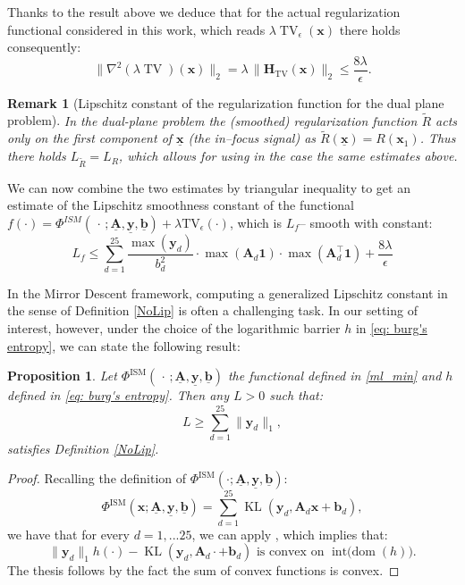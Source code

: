 \documentclass[letterpaper]{article}
\newcommand{\x}{\mathbf{x}}
\newcommand{\A}{\mathbf{A}}
\newcommand{\y}{\mathbf{y}}
\newtheorem{proposition}{Proposition}
\newtheorem{remark}{Remark}
\begin{document}
Thanks to the result above we deduce that for the actual regularization functional considered in this work, which reads $\lambda\operatorname{TV}_\epsilon(\mathbf{x})$ there holds consequently:
\begin{equation}
\|\nabla^2(\lambda\operatorname{TV})(\mathbf{x})\|_2 
    = \lambda\,\|\mathbf{H}_{\text{TV}}(\mathbf{x})\|_2 \leq \frac{8\lambda}{\epsilon}.
\end{equation}

\begin{remark}[Lipschitz constant of the regularization function for the dual plane problem]
    In the dual-plane problem the (smoothed) regularization function $\tilde{R}$ acts only on the first component of $\underline{\x}$ (the in--focus signal) as $\tilde{R}(\underline{\x}) = R(\x_1)$. Thus there holds $L_{\tilde{R}} = L_{R}$, which allows for using in the case the same estimates above.
\end{remark}
We can now combine the two estimates by triangular inequality to get an estimate of the Lipschitz smoothness constant of the functional $f(\cdot) = \Phi^{ISM}(\,\cdot\,; \underline{\mathbf{A}}, \underline{\mathbf{y}}, 
\underline{\mathbf{b}}) + \lambda \text{TV}_{\epsilon}(\cdot)$, which is $L_{f}$-- smooth with constant:
\begin{equation}
    L_{f} \leq \sum_{d=1}^{25} 
    \frac{\max(\mathbf{y}_d)}{b_d^2} \cdot \max(\mathbf{A}_d \mathbf{1}) \cdot 
    \max(\mathbf{A}_d^\top \mathbf{1}) + \frac{8 \lambda}{\epsilon}
    \end{equation}


In the Mirror Descent framework, computing a generalized Lipschitz constant in the sense of Definition \ref{NoLip} is often a challenging task. In our setting of interest, however, under the choice of the logarithmic barrier $h$ in \eqref{eq: burg's entropy}, we can state the following result:
\begin{proposition}
    Let $\Phi^{\text{ISM}}(\,\cdot\,; \underline{\mathbf{A}}, \underline{\mathbf{y}}, 
\underline{\mathbf{b}})$  the functional defined in \eqref{ml_min} and $h$ defined in \eqref{eq: burg's entropy}. Then any $L> 0$ such that:
\begin{equation}
    L \geq \sum^{25}_{d=1} \|\y_d\|_1,
\end{equation}
satisfies Definition \ref{NoLip}.
\end{proposition}
\begin{proof}
Recalling the definition of $\Phi^{\text{ISM}}(\cdot;\underline{\mathbf{A}}, \underline{\mathbf{y}}, \underline{\mathbf{b}})$:
$$
\Phi^{\text{ISM}}(\x;\underline{\mathbf{A}}, \underline{\mathbf{y}}, \underline{\mathbf{b}})
=
\sum_{d=1}^{25}
\operatorname{KL}(\mathbf{y}_d,\A_d\x+\mathbf{b}_d),$$
we have that for every $d = 1,...25$, we can apply \cite[Lemma 7]{nolip}, which implies that: \begin{equation}
    \|\y_d\|_1 h(\cdot) - \operatorname{KL}(\mathbf{y}_d,\A_d\cdot+\mathbf{b}_d) \text{ is convex on } \operatorname{\operatorname{int}(dom}(h)).
\end{equation}
The thesis follows by the fact the sum of convex functions is convex.
\end{proof}
\end{document}
